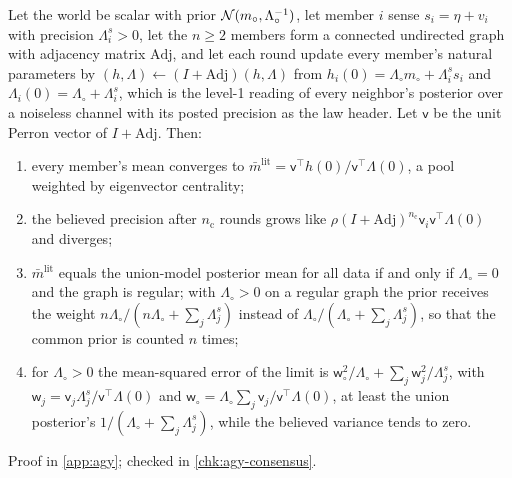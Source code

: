 \begin{proposition}\label{prop:agy-literal-consensus}
Let the world be scalar with prior $\mathcal{N}(m_\circ,\Lambda_\circ^{-1})$, let member $i$ sense $s_i=\eta+v_i$ with precision $\Lambda^s_i>0$, let the $n\ge2$ members form a connected undirected graph with adjacency matrix $\mathrm{Adj}$, and let each round update every member's natural parameters by $(h,\Lambda)\leftarrow(I+\mathrm{Adj})(h,\Lambda)$ from $h_i(0)=\Lambda_\circ m_\circ+\Lambda^s_is_i$ and $\Lambda_i(0)=\Lambda_\circ+\Lambda^s_i$, which is the level-1 reading of every neighbor's posterior over a noiseless channel with its posted precision as the law header. Let $\mathsf v$ be the unit Perron vector of $I+\mathrm{Adj}$. Then:
\begin{enumerate}
\item[(a)] every member's mean converges to $\bar m^{\mathrm{lit}}=\mathsf v^\top h(0)/\mathsf v^\top\Lambda(0)$, a pool weighted by eigenvector centrality;
\item[(b)] the believed precision after $n_{\mathrm c}$ rounds grows like $\rho(I+\mathrm{Adj})^{n_{\mathrm c}}\mathsf v_i\mathsf v^\top\Lambda(0)$ and diverges;
\item[(c)] $\bar m^{\mathrm{lit}}$ equals the union-model posterior mean for all data if and only if $\Lambda_\circ=0$ and the graph is regular; with $\Lambda_\circ>0$ on a regular graph the prior receives the weight $n\Lambda_\circ/(n\Lambda_\circ+\sum_j\Lambda^s_j)$ instead of $\Lambda_\circ/(\Lambda_\circ+\sum_j\Lambda^s_j)$, so that the common prior is counted $n$ times;
\item[(d)] for $\Lambda_\circ>0$ the mean-squared error of the limit is $\mathsf w_\circ^2/\Lambda_\circ+\sum_j\mathsf w_j^2/\Lambda^s_j$, with $\mathsf w_j=\mathsf v_j\Lambda^s_j/\mathsf v^\top\Lambda(0)$ and $\mathsf w_\circ=\Lambda_\circ\sum_j\mathsf v_j/\mathsf v^\top\Lambda(0)$, at least the union posterior's $1/(\Lambda_\circ+\sum_j\Lambda^s_j)$, while the believed variance tends to zero.
\end{enumerate}
Proof in \cref{app:agy}; checked in \cref{chk:agy-consensus}.
\end{proposition}

